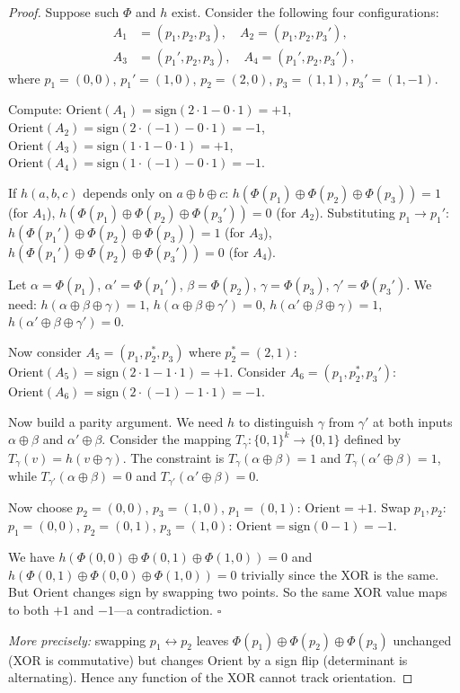 \documentclass[11pt,letterpaper]{article}
\newcommand{\sign}{\mathrm{sign}}
\newcommand{\Orient}{\mathrm{Orient}}
\begin{document}
\begin{proof}
Suppose such $\Phi$ and $h$ exist.  Consider the following four configurations:
\begin{align*}
A_1 &= (p_1, p_2, p_3),\quad
A_2 = (p_1, p_2, p_3'), \\
A_3 &= (p_1', p_2, p_3),\quad
A_4 = (p_1', p_2, p_3'),
\end{align*}
where $p_1=(0,0)$, $p_1'=(1,0)$, $p_2=(2,0)$, $p_3=(1,1)$, $p_3'=(1,-1)$.

Compute:
$\Orient(A_1)=\sign(2\cdot1-0\cdot1)=+1$,
$\Orient(A_2)=\sign(2\cdot(-1)-0\cdot1)=-1$,
$\Orient(A_3)=\sign(1\cdot1-0\cdot1)=+1$,
$\Orient(A_4)=\sign(1\cdot(-1)-0\cdot1)=-1$.

If $h(a,b,c)$ depends only on $a\oplus b\oplus c$:
$h(\Phi(p_1)\oplus\Phi(p_2)\oplus\Phi(p_3))=1$ (for $A_1$),
$h(\Phi(p_1)\oplus\Phi(p_2)\oplus\Phi(p_3'))=0$ (for $A_2$).
Substituting $p_1\to p_1'$:
$h(\Phi(p_1')\oplus\Phi(p_2)\oplus\Phi(p_3))=1$ (for $A_3$),
$h(\Phi(p_1')\oplus\Phi(p_2)\oplus\Phi(p_3'))=0$ (for $A_4$).

Let $\alpha=\Phi(p_1)$, $\alpha'=\Phi(p_1')$, $\beta=\Phi(p_2)$,
$\gamma=\Phi(p_3)$, $\gamma'=\Phi(p_3')$.
We need: $h(\alpha\oplus\beta\oplus\gamma)=1$, $h(\alpha\oplus\beta\oplus\gamma')=0$,
$h(\alpha'\oplus\beta\oplus\gamma)=1$, $h(\alpha'\oplus\beta\oplus\gamma')=0$.

Now consider $A_5=(p_1,p_2^*,p_3)$ where $p_2^*=(2,1)$:
$\Orient(A_5)=\sign(2\cdot1-1\cdot1)=+1$.
Consider $A_6=(p_1,p_2^*,p_3')$:
$\Orient(A_6)=\sign(2\cdot(-1)-1\cdot1)=-1$.

Now build a parity argument.  We need $h$ to distinguish
$\gamma$ from $\gamma'$ at both inputs $\alpha\oplus\beta$ and $\alpha'\oplus\beta$.
Consider the mapping $T_\gamma:\{0,1\}^k\to\{0,1\}$ defined by
$T_\gamma(v)=h(v\oplus\gamma)$.  The constraint is $T_\gamma(\alpha\oplus\beta)=1$ and
$T_\gamma(\alpha'\oplus\beta)=1$, while $T_{\gamma'}(\alpha\oplus\beta)=0$ and
$T_{\gamma'}(\alpha'\oplus\beta)=0$.

Now choose $p_2=(0,0)$, $p_3=(1,0)$, $p_1=(0,1)$: $\Orient=+1$.
Swap $p_1,p_2$: $p_1=(0,0)$, $p_2=(0,1)$, $p_3=(1,0)$: $\Orient=\sign(0-1)=-1$.

We have $h(\Phi(0,0)\oplus\Phi(0,1)\oplus\Phi(1,0))=0$ and
$h(\Phi(0,1)\oplus\Phi(0,0)\oplus\Phi(1,0))=0$ trivially since the XOR is the same.
But $\Orient$ changes sign by swapping two points.  So the same XOR value maps to both
$+1$ and $-1$---a contradiction.  $\square$

\noindent\emph{More precisely:} swapping $p_1\leftrightarrow p_2$ leaves
$\Phi(p_1)\oplus\Phi(p_2)\oplus\Phi(p_3)$ unchanged (XOR is commutative) but changes
$\Orient$ by a sign flip (determinant is alternating).  Hence any function of the XOR
cannot track orientation.
\end{proof}
\end{document}
